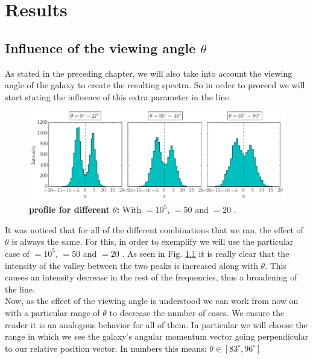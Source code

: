 \setcounter{equation}{0}
\chapter{Results}

\section{Influence of the viewing angle $\theta$}
As stated in the preceding chapter, we will also take into account the viewing angle of the galaxy to create the resulting spectra. So in order to proceed we will start stating the influence of this extra parameter in the \lya line. 

\begin{figure}[h!]
	\begin{center}
		\includegraphics[width=1\textwidth]{./figures/chapter3/influence_viewing_angle2}
	\end{center}
	\caption{\textbf{\lya profile for different $\theta$:} With \tauh$=10^5$, \vrot$=50$ \kms and \vout$=20$ \kms.
		\label{fig:influence_viewing_angle}}
\end{figure}

It was noticed that for all of the different combinations that we ran, the effect of $\theta$ is always the same. For this, in order to exemplify we will use the particular case of \tauh$=10^5$, \vrot$=50$ \kms and \vout$=20$ \kms. As seen in Fig. \ref{fig:influence_viewing_angle} it is really clear that the intensity of the valley between the two peaks is increased along with $\theta$. This causes an intensity decrease in the rest of the frequencies, thus a broadening of the line. \\

Now, as the effect of the viewing angle is understood we can work from now on with a particular range of $\theta$ to decrease the number of cases. We ensure the reader it is an analogous behavior for all of them. In particular we will choose the range in which we see the galaxy's angular momentum vector going perpendicular to our relative position vector. In numbers this means: $\theta \in [83^\circ,96^\circ]$\\

